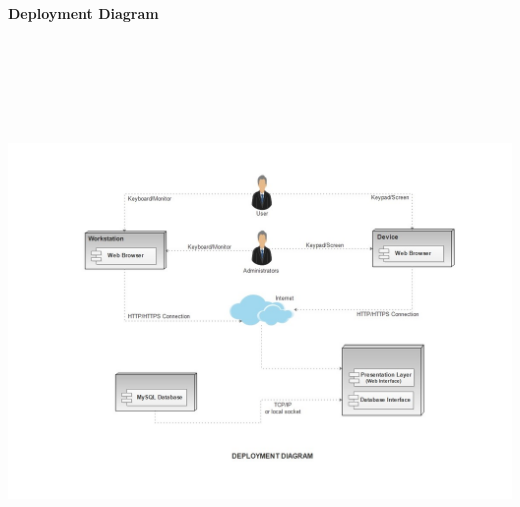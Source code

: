 \newpage

\begin{center} 
	\textbf{Deployment Diagram}
\end{center}
\begin{center}
	\includegraphics[width=14cm,height=15cm]{image/i.jpg}
\end{center}
\vfill